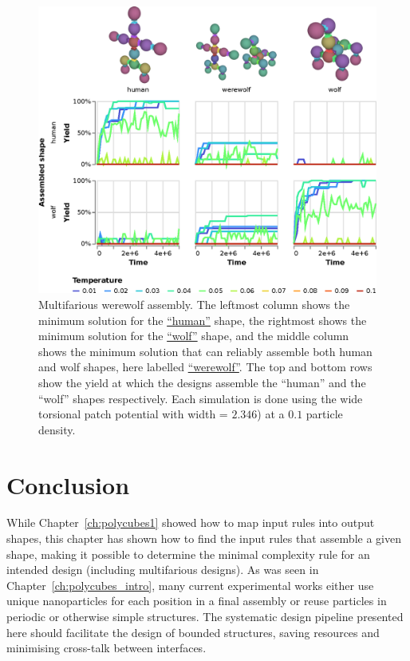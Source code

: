 \begin{figure}
    \centering
    \includegraphics[width=\linewidth]{figures/patchysim/werewolf.eps}
    \caption{Multifarious werewolf assembly. The leftmost column shows the minimum solution for the  \href{https://akodiat.github.io/polycubes/?assemblyMode=stochastic&rule=00000e040f0c88880000120000008f1600000000000b1400938700000000000000000096}{``human''} shape, the rightmost shows the minimum solution for the  \href{https://akodiat.github.io/polycubes/?assemblyMode=stochastic&rule=04000909000c0013000009098a00001400000000000009840000938c0000000000009700}{``wolf''} shape, and the middle column shows the minimum solution that can reliably assemble both human and wolf shapes, here labelled \href{https://akodiat.github.io/polycubes/?assemblyMode=stochastic&rule=11051013000018001d1d0008001700001d1da1001d1d00009e00000c0000000000000d93000000001d98000000002284000097880000000000008f00}{``werewolf''}. The top and bottom rows show the yield at which the designs assemble the ``human'' and the ``wolf'' shapes respectively. Each simulation is done using the wide torsional patch potential with width = \(2.346\)) at a \(0.1\) particle density.}
    \label{fig:multifarious_sim}
\end{figure}

\FloatBarrier
\section{Conclusion}
While Chapter~\ref{ch:polycubes1} showed how to map input rules into output shapes, this chapter has shown how to find the input rules that assemble a given shape, making it possible to determine the minimal complexity rule for an intended design (including multifarious designs). As was seen in Chapter~\ref{ch:polycubes_intro}, many current experimental works either use unique nanoparticles for each position in a final assembly or reuse particles in periodic or otherwise simple structures. The systematic design pipeline presented here should facilitate the design of bounded structures, saving resources and minimising cross-talk between interfaces.